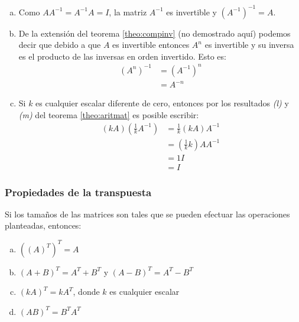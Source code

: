 \documentclass[a4paper,12pt]{article}
\begin{document}
\demo
\begin{enumerate}[(a)]
  \item Como $AA^{-1}=A^{-1}A=I$, la matriz $A^{-1}$ es invertible y
    $(A^{-1})^{-1}=A$.
  \item De la extensión del teorema \ref{theo:compinv} (no demostrado aquí)
    podemos decir que debido a que $A$ es invertible entonces $A^n$ es
    invertible y su inversa es el producto de las inversas en orden invertido.
    Esto es:
    \begin{align*}
      \left( A^n \right)^{-1} &= \left( A^{-1} \right)^n \\
      &= A^{-n}
    \end{align*}
  \item Si $k$ es cualquier escalar diferente de cero, entonces por los
    resultados \emph{(l)} y \emph{(m)} del teorema \ref{theo:aritmat} es
    posible escribir:
    \begin{align*}
      (kA)\left( \frac{1}{k}A^{-1} \right) &= \frac{1}{k}(kA)A^{-1} \\
                                            &=\left( \frac{1}{k}k \right)AA^{-1} \\
                                            &= 1I \\
                                            &= I
    \end{align*}
\end{enumerate}


\subsubsection{Propiedades de la transpuesta}

\begin{theorem}
  Si los tamaños de las matrices son tales que se pueden efectuar las
  operaciones planteadas, entonces:
  \begin{enumerate}[(a)]
    \item $\left( (A)^T \right) ^T=A$
    \item $(A+B)^T=A^T+B^T$ y $(A-B)^T=A^T-B^T$
    \item $(kA)^T=kA^T$, donde $k$ es cualquier escalar
    \item $(AB)^T=B^TA^T$
  \end{enumerate}
  \label{theo:operactrans}
\end{theorem}
\end{document}
